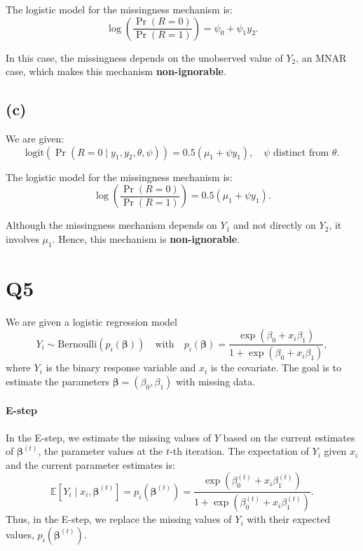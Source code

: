 \documentclass{article}
\begin{document}
The logistic model for the missingness mechanism is:
\[
\log\left(\frac{\Pr(R = 0)}{\Pr(R = 1)}\right) = \psi_0 + \psi_1 y_2.
\]

In this case, the missingness depends on the unobserved value of \(Y_2\), an MNAR case, which makes this mechanism \textbf{non-ignorable}.

\newpage

\subsection{(c)}
We are given:
\[
\text{logit}\left(\Pr(R = 0 \mid y_1, y_2, \theta, \psi)\right) = 0.5(\mu_1 + \psi y_1), \quad \psi \text{ distinct from } \theta.
\]

The logistic model for the missingness mechanism is:
\[
\log\left(\frac{\Pr(R = 0)}{\Pr(R = 1)}\right) = 0.5(\mu_1 + \psi y_1).
\]

Although the missingness mechanism depends on \(Y_1\) and not directly on \(Y_2\), it involves \(\mu_1\). Hence, this mechanism is \textbf{non-ignorable}.

\newpage

\section{Q5}

We are given a logistic regression model
\[
Y_i \sim \text{Bernoulli}(p_i(\boldsymbol{\beta})) \quad \text{with} \quad p_i(\boldsymbol{\beta}) = \frac{\exp(\beta_0 + x_i \beta_1)}{1 + \exp(\beta_0 + x_i \beta_1)},
\]
where \( Y_i \) is the binary response variable and \( x_i \) is the covariate. The goal is to estimate the parameters \( \boldsymbol{\beta} = (\beta_0, \beta_1) \) with missing data.

\paragraph{E-step}
In the E-step, we estimate the missing values of \( Y \) based on the current estimates of \( \boldsymbol{\beta}^{(t)} \), the parameter values at the \( t \)-th iteration. The expectation of \( Y_i \) given \( x_i \) and the current parameter estimates is:
\[
\mathbb{E}[Y_i \mid x_i, \boldsymbol{\beta}^{(t)}] = p_i(\boldsymbol{\beta}^{(t)}) = \frac{\exp(\beta_0^{(t)} + x_i \beta_1^{(t)})}{1 + \exp(\beta_0^{(t)} + x_i \beta_1^{(t)})}.
\]
Thus, in the E-step, we replace the missing values of \( Y_i \) with their expected values, \( p_i(\boldsymbol{\beta}^{(t)}) \).
\end{document}
